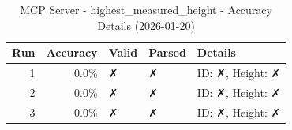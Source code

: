 \begin{table}[ht]
\centering
\small
\caption{MCP Server - highest\_measured\_height - Accuracy Details (2026-01-20)}
\label{tab:mcp\_highest\_measured\_height\_accuracy\_2026-01-20}
\begin{tabular}{r r l l p{6cm}}
\hline
Run & Accuracy & Valid & Parsed & Details \\
\hline
1 & 0.0\% & ✗ & ✗ & ID: ✗, Height: ✗ \\
2 & 0.0\% & ✗ & ✗ & ID: ✗, Height: ✗ \\
3 & 0.0\% & ✗ & ✗ & ID: ✗, Height: ✗ \\
\hline
\end{tabular}
\end{table}
